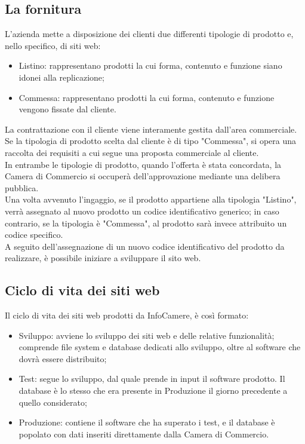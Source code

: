 	\subsection{La fornitura}
	L'azienda mette a disposizione dei clienti due differenti tipologie di prodotto e, nello specifico, di siti web:
	\begin{itemize}
		\item{Listino: rappresentano prodotti la cui forma, contenuto e funzione siano idonei alla replicazione;}
		\item{Commessa: rappresentano prodotti la cui forma, contenuto e funzione vengono fissate dal cliente.}
	\end{itemize}
	La contrattazione con il cliente viene interamente gestita dall'area commerciale. \\
	Se la tipologia di prodotto scelta dal cliente è di tipo "Commessa", si opera una raccolta dei requisiti a cui segue una proposta commerciale al cliente. \\
	In entrambe le tipologie di prodotto, quando l'offerta è stata concordata, la Camera di Commercio si occuperà dell'approvazione mediante una delibera pubblica. \\
	Una volta avvenuto l'ingaggio, se il prodotto appartiene alla tipologia "Listino", verrà assegnato al nuovo prodotto un codice identificativo generico; in caso contrario, se la tipologia è "Commessa", al prodotto sarà invece attribuito un codice specifico. \\
	A seguito dell'assegnazione di un nuovo codice identificativo del prodotto da realizzare, è possibile iniziare a sviluppare il sito web.
	
	\subsection{Ciclo di vita dei siti web}
	Il ciclo di vita dei siti web prodotti da InfoCamere, è così formato: 
	\begin{itemize}
		\item {Sviluppo: avviene lo sviluppo dei siti web e delle relative funzionalità; comprende file system e database dedicati allo sviluppo, oltre al software che dovrà essere distribuito;}
		\item {Test: segue lo sviluppo, dal quale prende in input il software prodotto. Il database è lo stesso che era presente in Produzione il giorno precedente a quello considerato;}
		\item{Produzione: contiene il software che ha superato i test, e il database è popolato con dati inseriti direttamente dalla Camera di Commercio.}
	\end{itemize}
	
